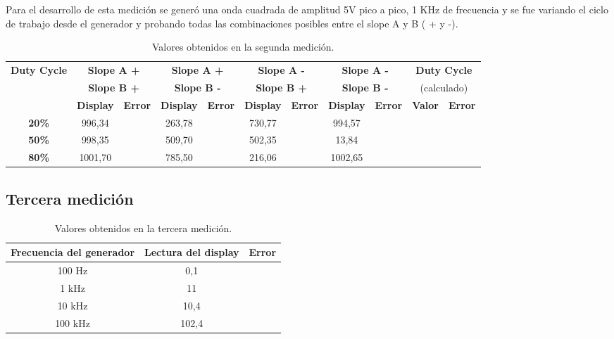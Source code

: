 \documentclass{article}
\begin{document}
	Para el desarrollo de esta medición se generó una onda cuadrada de amplitud 5V pico a pico, 1 KHz de frecuencia y se fue variando el ciclo de trabajo desde el generador y probando todas las combinaciones posibles entre el slope A y B ( + y -). 
\bigskip


\begin{table}[!hbt]
	\begin{center}

		\begin{tabular}{|c|c|c|c|c|c|c|c|c|c|c|} \hline
			\multirow{3}{*}{\textbf{Duty Cycle}}
			& \multicolumn{2}{c|}{\textbf{Slope A +}} & \multicolumn{2}{c|}{\textbf{Slope A +}} & \multicolumn{2}{c|}{\textbf{Slope A -}} & \multicolumn{2}{c|}{\textbf{Slope A -}} & \multicolumn{2}{c|}{\textbf{Duty Cycle}} \\
			& \multicolumn{2}{c|}{\textbf{Slope B +}} & \multicolumn{2}{c|}{\textbf{Slope B -}} & \multicolumn{2}{c|}{\textbf{Slope B +}} & \multicolumn{2}{c|}{\textbf{Slope B -}} & \multicolumn{2}{c|}{(calculado)} \\\cline{2-11}
			& \textbf{Display} & \textbf{Error} & \textbf{Display} & \textbf{Error} & \textbf{Display} & \textbf{Error} & \textbf{Display} & \textbf{Error} & \textbf{Valor} & \textbf{Error} \\\hline
			
			\textbf{20\%} & 996,34 &  & 263,78 &  & 730,77 &  & 994,57 &  &  &  \\\hline
			\textbf{50\%} & 998,35 &  & 509,70 &  & 502,35 &  & 13,84 &  &  &  \\\hline
			\textbf{80\%} & 1001,70 &  & 785,50 &  & 216,06 &  & 1002,65 &  &  &  \\\hline
		\end{tabular}

	\caption{Valores obtenidos en la segunda medición.}
	\end{center}
\end{table}
\medskip
	


\subsection{Tercera medición}
\medskip


\begin{table}[!hbt]
	\begin{center}
		\begin{tabular}{|c|c|c|} \hline
			\textbf{Frecuencia del generador} & \textbf{Lectura del display} & \textbf{Error} \\\hline
			100 Hz & 0,1 &  \\\hline
			1 kHz & 11 &  \\\hline
			10 kHz & 10,4 &  \\\hline
			100 kHz & 102,4 &  \\\hline
		\end{tabular}

	\caption{Valores obtenidos en la tercera medición.}
	\end{center}
\end{table}
\medskip
\end{document}
